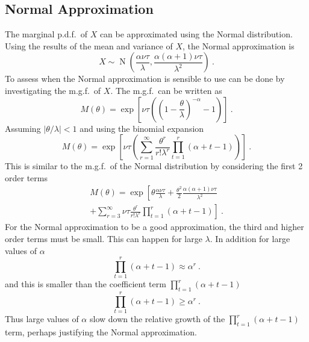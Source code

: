 \documentclass[a4paper]{proc}
\DeclareMathOperator{\normal}{N}
\begin{document}
\subsection{Normal Approximation}
The marginal p.d.f.~of $X$ can be approximated using the Normal distribution. Using the results of the mean and variance of $X$, the Normal approximation is
\begin{equation}
X\sim\normal\left(\frac{\alpha\nu\tau}{\lambda},\frac{\alpha(\alpha+1)\nu\tau}{\lambda^2}\right) \ .
\end{equation}
To assess when the Normal approximation is sensible to use can be done by investigating the m.g.f.~of $X$. The m.g.f.~can be written as
\begin{equation*}
M(\theta)=\exp\left[\nu\tau\left(\left(1-\frac{\theta}{\lambda}\right)^{-\alpha}-1\right)\right] \ .
\end{equation*}
Assuming $|\theta/\lambda|<1$ and using the binomial expansion
\begin{equation}
M(\theta)=\exp\left[\nu\tau\left(
\sum_{r=1}^{\infty}\frac{\theta^r}{r!\lambda^r}\prod_{t=1}^{r}(\alpha+t-1)
\right)\right] \ .
\end{equation}
This is similar to the m.g.f.~of the Normal distribution by considering the first 2 order terms
\begin{multline}
M(\theta)=\exp\left[\theta\frac{\alpha\nu\tau}{\lambda}+\frac{\theta^2}{2}\frac{\alpha(\alpha+1)\nu\tau}{\lambda^2}
\right.\\\left.
+\sum_{r=3}^\infty\nu\tau\frac{\theta^r}{r!\lambda^r}\prod_{t=1}^{r}(\alpha+t-1)
\right] \ .
\end{multline}
For the Normal approximation to be a good approximation, the third and higher order terms must be small. This can happen for large $\lambda$. In addition for large values of $\alpha$ 
\begin{equation}
\prod_{t=1}^{r}(\alpha+t-1)\approx\alpha^r \ .
\end{equation}
and this is smaller than the coefficient term $\prod_{t=1}^{r}(\alpha+t-1)$
\begin{equation}
\prod_{t=1}^{r}(\alpha+t-1) \geqslant \alpha^r \ .
\end{equation}
Thus large values of $\alpha$ slow down the relative growth of the $\prod_{t=1}^{r}(\alpha+t-1)$ term, perhaps justifying the Normal approximation.
\end{document}
